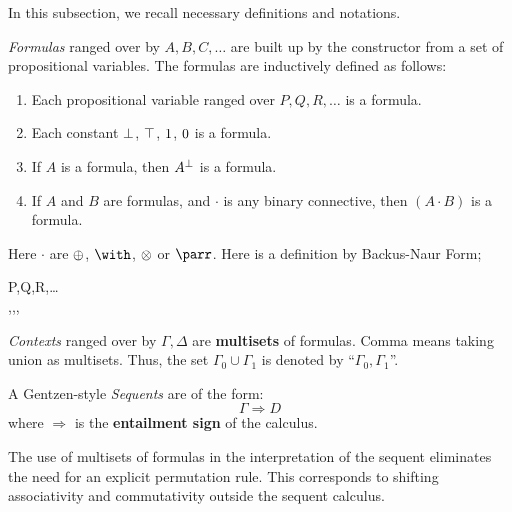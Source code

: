 \def\fCenter{\entails}

In this subsection, we recall necessary definitions and
notations. 
%
%
\begin{definition}[formulas]
{\em Formulas} ranged over by $A,B,C,\ldots$ are built up by the
constructor from a set of propositional variables. 
The formulas are inductively defined as follows:
\begin{enumerate}
\item Each propositional variable ranged over $P,Q,R,\ldots$ is a formula.
\item Each constant $\bot$, $\top$, $\mbox{\boldmath{1}}$, $\mbox{\boldmath{0}}$ is a formula. 
\item If $A$ is a formula, then ${{A}^{\bot}}$ is a formula.
\item If $A$ and $B$ are formulas, 
and $\cdot$  is any binary connective, then $(A \cdot B)$ is a formula.
\end{enumerate}
\end{definition}

Here $\cdot$  are  
$\oplus$, $\with$, $\otimes$ or $\parr$. 
Here is a definition by Backus-Naur Form;
\begin{bnf*}
    	{P,Q,R,\ldots} \\
    	{\LLbot,\LLtop,\LLone,\LLzero} \\
     {
		 \bnfor
		 \bnfor
		 \bnfor
		 \bnfsp \cdot \bnfsp {}
	}
\end{bnf*}

%
%
\begin{definition}[context]
{\em Contexts} ranged over by $\Gamma,\Delta$ are {\bf multisets} of  formulas. 
Comma means taking union as multisets. Thus, the set $\Gamma_0
\cup \Gamma_1$ is denoted by ``$\Gamma_0,\Gamma_1$''.
\end{definition}
%
%
\begin{definition}[sequents]
A Gentzen-style {\em Sequents} are of the form:
\[{\Gamma} \Rightarrow {D} \]
where $\Rightarrow$ is the {\bf entailment sign} of the calculus.
\end{definition}
%
% 
The use of multisets of formulas in the interpretation of the sequent 
eliminates the need for an explicit permutation rule. 
This corresponds to shifting associativity and commutativity 
outside the sequent calculus.

